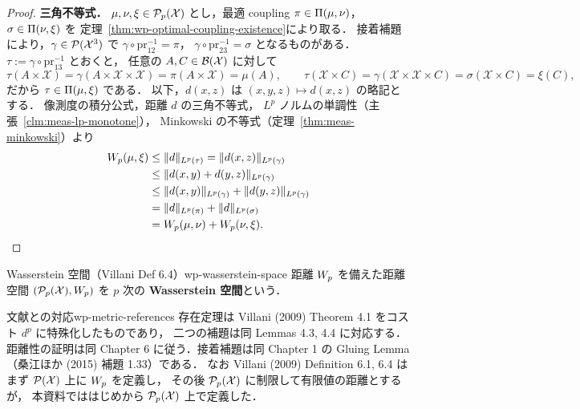 \begin{proof}
  \textbf{三角不等式．}
  $\mu,\nu,\xi\in\mathcal{P}_{p}(\mathcal{X})$ とし，最適 coupling
  $\pi\in\Pi(\mu,\nu)$，$\sigma\in\Pi(\nu,\xi)$ を
  定理~\ref{thm:wp-optimal-coupling-existence}により取る．
  接着補題により，$\gamma\in\mathcal{P}(\mathcal{X}^3)$ で
  $\gamma\circ\mathrm{pr}_{12}^{-1}=\pi$，
  $\gamma\circ\mathrm{pr}_{23}^{-1}=\sigma$ となるものがある．
  $\tau:=\gamma\circ\mathrm{pr}_{13}^{-1}$ とおくと，
  任意の $A,C\in\mathcal{B}(\mathcal{X})$ に対して
  \[
    \tau(A\times\mathcal{X})
    =\gamma(A\times\mathcal{X}\times\mathcal{X})
    =\pi(A\times\mathcal{X})=\mu(A),
    \qquad
    \tau(\mathcal{X}\times C)
    =\gamma(\mathcal{X}\times\mathcal{X}\times C)
    =\sigma(\mathcal{X}\times C)=\xi(C),
  \]
  だから $\tau\in\Pi(\mu,\xi)$ である．
  以下，$d(x,z)$ は $(x,y,z)\mapsto d(x,z)$ の略記とする．
  像測度の積分公式，距離 $d$ の三角不等式，
  $L^p$ ノルムの単調性（主張~\ref{clm:meas-lp-monotone}），
  Minkowski の不等式（定理~\ref{thm:meas-minkowski}）より
  \begin{align*}
    W_p(\mu,\xi)
    &\leq \lVert d \rVert_{L^p(\tau)}
     =\lVert d(x,z) \rVert_{L^p(\gamma)}\\
    &\leq \lVert d(x,y)+d(y,z) \rVert_{L^p(\gamma)}\\
    &\leq \lVert d(x,y) \rVert_{L^p(\gamma)}
      +\lVert d(y,z) \rVert_{L^p(\gamma)}\\
    &=\lVert d \rVert_{L^p(\pi)}+\lVert d \rVert_{L^p(\sigma)}\\
    &=W_p(\mu,\nu)+W_p(\nu,\xi).
  \end{align*}
\end{proof}

\begin{definition}{Wasserstein 空間（Villani Def 6.4）}{wp-wasserstein-space}
  距離 $W_p$ を備えた距離空間
  $(\mathcal{P}_{p}(\mathcal{X}),W_p)$ を
  $p$ 次の \textbf{Wasserstein 空間}という．
\end{definition}

\begin{remark}{文献との対応}{wp-metric-references}
  存在定理は Villani (2009) Theorem 4.1 をコスト $d^p$ に特殊化したものであり，
  二つの補題は同 Lemmas 4.3, 4.4 に対応する．
  距離性の証明は同 Chapter 6 に従う．接着補題は同 Chapter 1 の
  Gluing Lemma（桑江ほか (2015) 補題 1.33）である．
  なお Villani (2009) Definition 6.1, 6.4 は
  まず $\mathcal{P}(\mathcal{X})$ 上に $W_p$ を定義し，
  その後 $\mathcal{P}_{p}(\mathcal{X})$ に制限して有限値の距離とするが，
  本資料でははじめから $\mathcal{P}_{p}(\mathcal{X})$ 上で定義した．
\end{remark}
